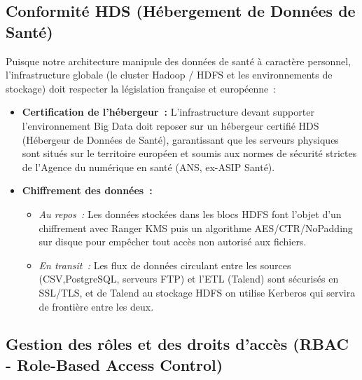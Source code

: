 \subsection{Conformité HDS (Hébergement de Données de Santé)}

\noindent Puisque notre architecture manipule des données de santé à caractère personnel, l'infrastructure globale (le cluster Hadoop / HDFS et les environnements de stockage) doit respecter la législation française et européenne~:
\begin{itemize}
	\item \textbf{Certification de l'hébergeur~:} L'infrastructure devant supporter l'environnement Big Data doit reposer sur un hébergeur certifié HDS (Hébergeur de Données de Santé), garantissant que les serveurs physiques sont situés sur le territoire européen et soumis aux normes de sécurité strictes de l'Agence du numérique en santé (ANS, ex-ASIP Santé).
	\item \textbf{Chiffrement des données~:}
	\begin{itemize}
		\item \textit{Au repos~:} Les données stockées dans les blocs HDFS font l'objet d'un chiffrement avec Ranger KMS puis un algorithme AES/CTR/NoPadding sur disque pour empêcher tout accès non autorisé aux fichiers.
		\item \textit{En transit~:} Les flux de données circulant entre les sources (CSV,PostgreSQL, serveurs FTP) et l'ETL (Talend) sont sécurisés en SSL/TLS, et de Talend au stockage HDFS on utilise Kerberos qui servira de frontière entre les deux.
	\end{itemize}
\end{itemize}

\subsection{Gestion des rôles et des droits d'accès (RBAC - Role-Based Access Control)}

